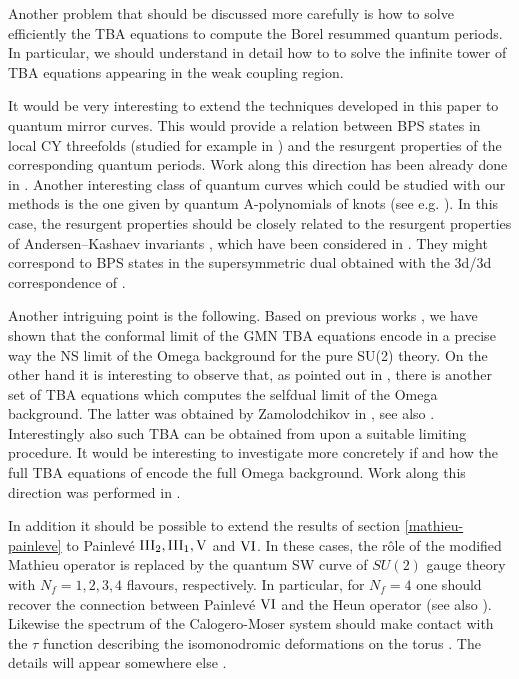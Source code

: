 \documentclass[a4paper,11pt]{article}
\theoremstyle{definition}
\begin{document}
Another problem that should be discussed more carefully is how to
solve efficiently the TBA equations to compute the Borel resummed
quantum periods. In particular, we should understand in detail how to
to solve the infinite tower of TBA equations appearing in the weak
coupling region.

It would be very interesting to extend the techniques developed in
this paper to quantum mirror curves. This would provide a relation
between BPS states in local CY threefolds (studied for example in
\cite{dfr}) and the resurgent properties of the corresponding quantum
periods. Work along this direction has been already done in
\cite{eager, longhi}.  Another interesting class of quantum curves
which could be studied with our methods is the one given by quantum
A-polynomials of knots (see e.g. \cite{exact-dimofte}). In this case,
the resurgent properties should be closely related to the resurgent
properties of Andersen--Kashaev invariants \cite{ak}, which have been
considered in \cite{gmp, gh,andersen}. They might correspond to BPS
states in the supersymmetric dual obtained with the 3d/3d
correspondence of \cite{dgg}.

Another intriguing point is the following. Based on previous works
\cite{oper,ims}, we have shown that the conformal limit of the GMN TBA
equations encode in a precise way the NS limit of the Omega background
for the pure SU(2) theory. On the other hand it is interesting to
observe that, as pointed out in \cite{bgt}, there is another set of
TBA equations which computes the selfdual limit of the Omega
background. The latter was obtained by Zamolodchikov in \cite{zamo},
see also \cite{Fendley:1999zd}.  Interestingly also such TBA can be
obtained from \cite{gmn} upon a suitable limiting procedure.  It would
be interesting to investigate more concretely if and how the full TBA
equations of \cite{gmn} encode the full Omega background. Work along
this direction was performed in \cite{Cecotti:2014wea}.
	
In addition it should be possible to extend the results of section
\ref{mathieu-painleve} to Painlev\'e $\rm III_2, III_1, V$ and
$\rm VI$. In these cases, the r\^ole of the modified Mathieu operator
is replaced by the quantum SW curve of $SU(2)$ gauge theory with
$N_f=1,2,3,4$ flavours, respectively. In particular, for $N_f=4$ one
should recover the connection between Painlev\'e $\rm VI$ and the Heun
operator \cite{Litvinov:2013sxa} (see also
\cite{Lencses:2017dgf}). Likewise the spectrum of the Calogero-Moser
system should make contact with the $\tau$ function describing the
isomonodromic deformations on the torus \cite{Bonelli:2019boe}. The
details will appear somewhere else \cite{BGG-p}.
\end{document}
